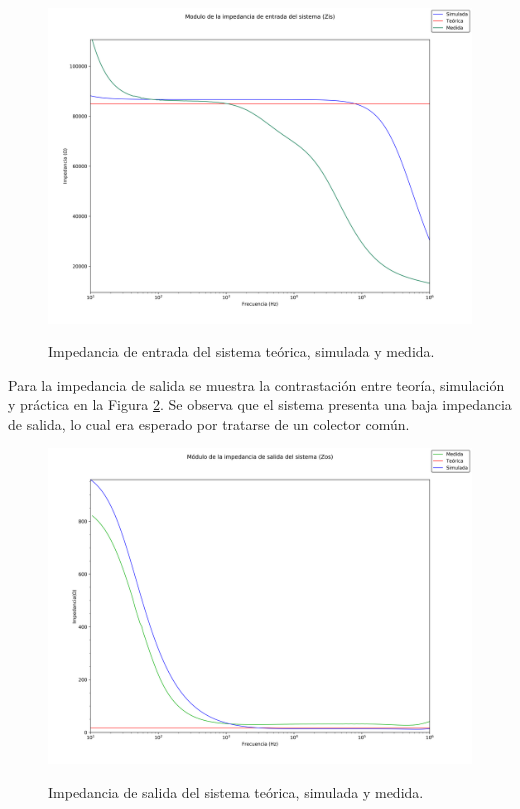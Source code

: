 		\begin{figure}[H]
			\centering
			\includegraphics[scale=0.4]{./Imagenes/Modulo_zin.png} \\
			\caption{Impedancia de entrada del sistema teórica, simulada y medida.}
			\label{fig_bode_zin}
		\end{figure}

Para la impedancia de salida se muestra la contrastación entre teoría, simulación y práctica en la Figura \ref{fig_bode_zout}. Se observa que el sistema presenta una baja impedancia de salida, lo cual era esperado por tratarse de un colector común. 


		\begin{figure}[H]
			\centering
			\includegraphics[scale=0.4]{./Imagenes/Modulo_zos.png} \\
			\caption{Impedancia de salida del sistema teórica, simulada y medida.}
			\label{fig_bode_zout}
		\end{figure}
 

